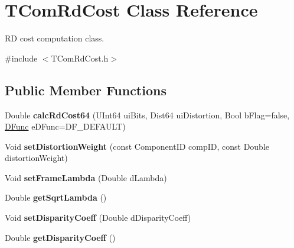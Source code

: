\hypertarget{class_t_com_rd_cost}{}\section{T\+Com\+Rd\+Cost Class Reference}
\label{class_t_com_rd_cost}


RD cost computation class.  




{\ttfamily \#include $<$T\+Com\+Rd\+Cost.\+h$>$}

\subsection*{Public Member Functions}
\begin{DoxyCompactItemize}
\item 
\mbox{\label{class_t_com_rd_cost_a6fc1b9bf8387869062457d695a02c432}} 
Double {\bfseries calc\+Rd\+Cost64} (U\+Int64 ui\+Bits, Dist64 ui\+Distortion, Bool b\+Flag=false, \hyperlink{_type_def_8h_ac19dbe1a542fc0c0bc8a94fcc55907c8}{D\+Func} e\+D\+Func=D\+F\+\_\+\+D\+E\+F\+A\+U\+LT)
\item 
\mbox{\label{class_t_com_rd_cost_a4580de47a4964c5baf586816bea448b6}} 
Void {\bfseries set\+Distortion\+Weight} (const Component\+ID comp\+ID, const Double distortion\+Weight)
\item 
\mbox{\label{class_t_com_rd_cost_af22c42a2a1f60e0037ef63f5b9d25c41}} 
Void {\bfseries set\+Frame\+Lambda} (Double d\+Lambda)
\item 
\mbox{\label{class_t_com_rd_cost_af1dba5636a1176cd9ef443c1ae688c32}} 
Double {\bfseries get\+Sqrt\+Lambda} ()
\item 
\mbox{\label{class_t_com_rd_cost_aebab02844683472be2c87266248ad303}} 
Void {\bfseries set\+Disparity\+Coeff} (Double d\+Disparity\+Coeff)
\item 
\mbox{\label{class_t_com_rd_cost_a3a5d2540b9e83cd3fbdd20dbd87dd98f}} 
Double {\bfseries get\+Disparity\+Coeff} ()
\item 
\mbox{\label{class_t_com_rd_cost_a2b1a80d86014bb6a70f18f47b50cddd2}} 

\end{DoxyCompactItemize}
